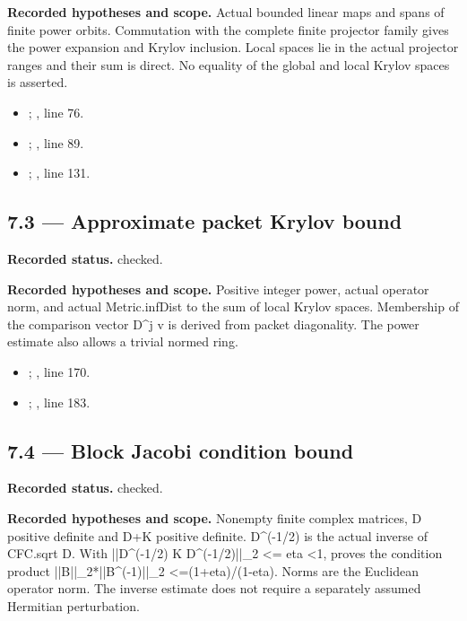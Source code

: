 \textbf{Recorded hypotheses and scope.} Actual bounded linear maps and spans of finite power orbits. Commutation with the complete finite projector family gives the power expansion and Krylov inclusion. Local spaces lie in the actual projector ranges and their sum is direct. No equality of the global and local Krylov spaces is asserted.

\begin{itemize}
\item {}; , line 76.
\item {}; , line 89.
\item {}; , line 131.
\end{itemize}
\subsection{7.3 — Approximate packet Krylov bound}
\label{result:7.3}
\textbf{Recorded status.} checked.

\textbf{Recorded hypotheses and scope.} Positive integer power, actual operator norm, and actual Metric.infDist to the sum of local Krylov spaces. Membership of the comparison vector D\textasciicircum{}j v is derived from packet diagonality. The power estimate also allows a trivial normed ring.

\begin{itemize}
\item {}; , line 170.
\item {}; , line 183.
\end{itemize}
\subsection{7.4 — Block Jacobi condition bound}
\label{result:7.4}
\textbf{Recorded status.} checked.

\textbf{Recorded hypotheses and scope.} Nonempty finite complex matrices, D positive definite and D+K positive definite. D\textasciicircum{}(-1/2) is the actual inverse of CFC.sqrt D. With ||D\textasciicircum{}(-1/2) K D\textasciicircum{}(-1/2)||\_2 <= eta <1, proves the condition product ||B||\_2*||B\textasciicircum{}(-1)||\_2 <=(1+eta)/(1-eta). Norms are the Euclidean operator norm. The inverse estimate does not require a separately assumed Hermitian perturbation.

